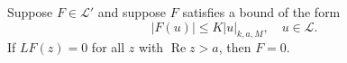 Suppose $F \in \mathcal{L}'$ and suppose $F$ satisfies a bound of the form
$$|F(u)| \leq K |u|_{k,a,M}, \quad u \in \mathcal{L}.$$
If $LF(z) = 0$ for all $z$ with $\operatorname{Re} z > a$, then $F = 0$.
